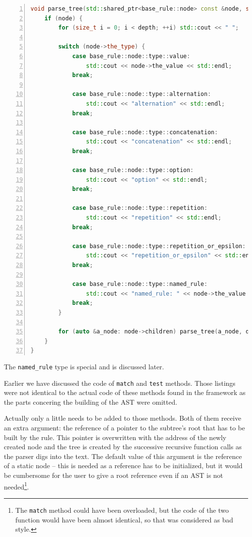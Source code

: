 \documentclass[12pt]{article}
\begin{document}
\begin{center}
	\begin{minipage}[h]{0.95\textwidth}
		\begin{lstlisting}[language=C++, breaklines=true, numbers=left]
void parse_tree(std::shared_ptr<base_rule::node> const &node, size_t depth=0) {
	if (node) {
		for (size_t i = 0; i < depth; ++i) std::cout << " ";

		switch (node->the_type) {
			case base_rule::node::type::value:
				std::cout << node->the_value << std::endl;
			break;

			case base_rule::node::type::alternation:
				std::cout << "alternation" << std::endl;
			break;

			case base_rule::node::type::concatenation:
				std::cout << "concatenation" << std::endl;
			break;

			case base_rule::node::type::option:
				std::cout << "option" << std::endl;
			break;

			case base_rule::node::type::repetition:
				std::cout << "repetition" << std::endl;
			break;

			case base_rule::node::type::repetition_or_epsilon:
				std::cout << "repetition_or_epsilon" << std::endl;
			break;

			case base_rule::node::type::named_rule:
				std::cout << "named_rule: " << node->the_value << std::endl;
			break;
		}

		for (auto &a_node: node->children) parse_tree(a_node, depth + 1);
	}
}
		\end{lstlisting}
	\end{minipage}
\end{center}

The \texttt{named\_rule} type is special and is discussed later.

Earlier we have discussed the code of \texttt{match} and \texttt{test} methods. Those listings were not
identical to the actual code of these methods found in the framework as the parts concering the building of
the AST were omitted.

Actually only a little needs to be added to those methods. Both of them receive an extra argument: the
reference of a pointer to the subtree's root that has to be built by the rule. This pointer is overwritten
with the address of the newly created node and the tree is created by the successive recursive function calls
as the parser digs into the text. The default value of this argument is the reference of a static node -- this
is needed as a reference has to be initialized, but it would be cumbersome for the user to give a root
reference even if an AST is not needed\footnote{The \texttt{match} method could have been overloaded, but the
code of the two function would have been almost identical, so that was considered as bad style.}.
\end{document}
